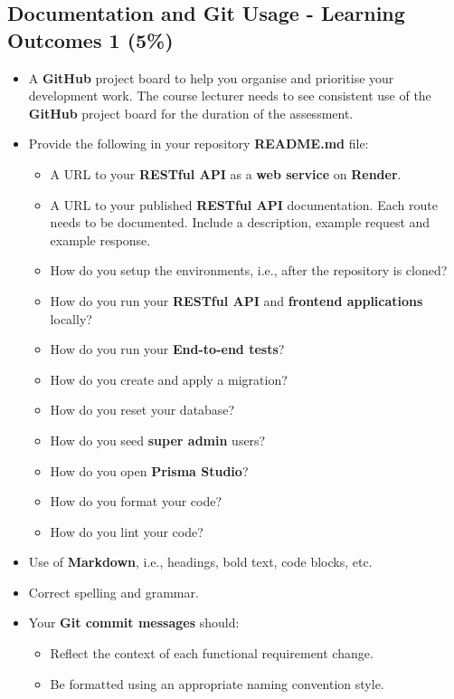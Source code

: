 \documentclass{article}
\begin{document}
\subsection*{Documentation and Git Usage - Learning Outcomes 1 (5\%)}
\begin{itemize}
	\item A \textbf{GitHub} project board to help you organise and prioritise your development work. The course lecturer needs to see consistent use of the \textbf{GitHub} project board for the duration of the assessment.
	\item Provide the following in your repository \textbf{README.md} file:
	\begin{itemize}
		\item A URL to your \textbf{RESTful API} as a \textbf{web service} on \textbf{Render}.
		\item A URL to your published \textbf{RESTful API} documentation. Each route needs to be documented. Include a description, example request and example response.
		\item How do you setup the environments, i.e., after the repository is cloned?
		\item How do you run your \textbf{RESTful API} and \textbf{frontend applications} locally?
		\item How do you run your \textbf{End-to-end tests}?
		\item How do you create and apply a migration?  
		\item How do you reset your database?
		\item How do you seed \textbf{super admin} users?
		\item How do you open \textbf{Prisma Studio}?
		\item How do you format your code?
		\item How do you lint your code?		
	\end{itemize}
    \item Use of \textbf{Markdown}, i.e., headings, bold text, code blocks, etc.
    \item Correct spelling and grammar.
    \item Your \textbf{Git commit messages} should:
    \begin{itemize}
      \item Reflect the context of each functional requirement change.
      \item Be formatted using an appropriate naming convention style.
    \end{itemize}
\end{itemize}
\end{document}
